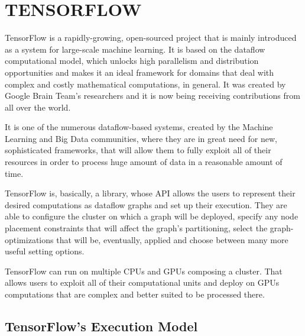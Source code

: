 \documentclass[ack,preface]{dithesis}
\begin{document}
\chapter{TENSORFLOW}

TensorFlow  \cite{Abadi:2016} is a rapidly-growing, open-sourced project that is mainly introduced as a system for large-scale machine learning. It is based on the dataflow computational model, which unlocks high parallelism and distribution opportunities and makes it an ideal framework for domains that deal with complex and costly mathematical computations, in general. It was created by Google Brain Team’s researchers and it is now being receiving contributions from all over the world. 

It is one of the numerous \cite{Zaharia:2012,Rossbach:2013, Theano, Jia2014caffe} dataflow-based systems, created by the Machine Learning and Big Data communities, where they are in great need for new, sophisticated frameworks, that will allow them to fully exploit all of their resources in order to process huge amount of data in a reasonable amount of time.

TensorFlow is, basically, a library, whose API allows the users to represent their desired computations as dataflow graphs and set up their execution. 
They are able to configure the cluster on which a graph will be deployed, specify any node placement constraints that will affect the graph's partitioning, select the graph-optimizations that will be, eventually, applied and choose between many more useful setting options.

TensorFlow can run on multiple CPUs and GPUs composing a cluster. That allows users to exploit all of their computational units and deploy on GPUs computations that are complex and better suited to be processed there.

    \section{TensorFlow's Execution Model}
\end{document}

